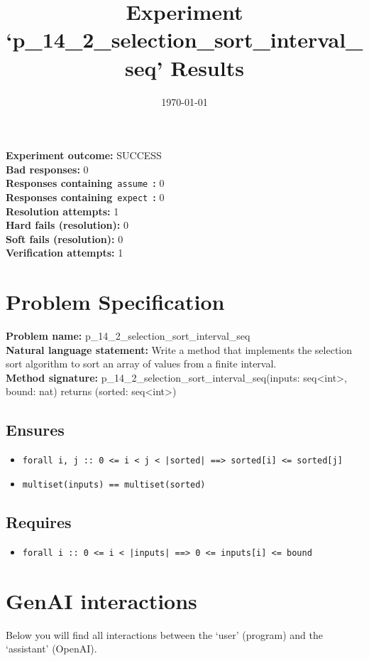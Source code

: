 \documentclass{article}
\begin{document}
\title{Experiment `p\_14\_2\_selection\_sort\_interval\_seq' Results}
\author{\today}
\date{}
\maketitle
\textbf{Experiment outcome: }SUCCESS
\\\textbf{Bad responses: }0
\\\textbf{Responses containing}~\texttt{assume}~\textbf{: }0
\\\textbf{Responses containing}~\texttt{expect}~\textbf{: }0
\\\textbf{Resolution attempts: }1
\\\textbf{Hard fails (resolution): }0
\\\textbf{Soft fails (resolution): }0
\\\textbf{Verification attempts: }1
\section*{Problem Specification}
\textbf{Problem name: }p\_14\_2\_selection\_sort\_interval\_seq
\\\textbf{Natural language statement: }Write a method that implements the selection sort algorithm to sort an array of values from a finite interval.
\\\textbf{Method signature: }p\_14\_2\_selection\_sort\_interval\_seq(inputs: seq<int>, bound: nat) returns (sorted: seq<int>)
\subsection*{Ensures}
\begin{itemize}
\item \texttt{forall i, j :: 0 <= i < j < |sorted| ==> sorted[i] <= sorted[j]}
\item \texttt{multiset(inputs) == multiset(sorted)}
\end{itemize}
\subsection*{Requires}
\begin{itemize}
\item \texttt{forall i :: 0 <= i < |inputs| ==> 0 <= inputs[i] <= bound}
\end{itemize}
\clearpage
\section*{GenAI interactions}
Below you will find all interactions between the `user' (program) and the `assistant' (OpenAI).
\end{document}
